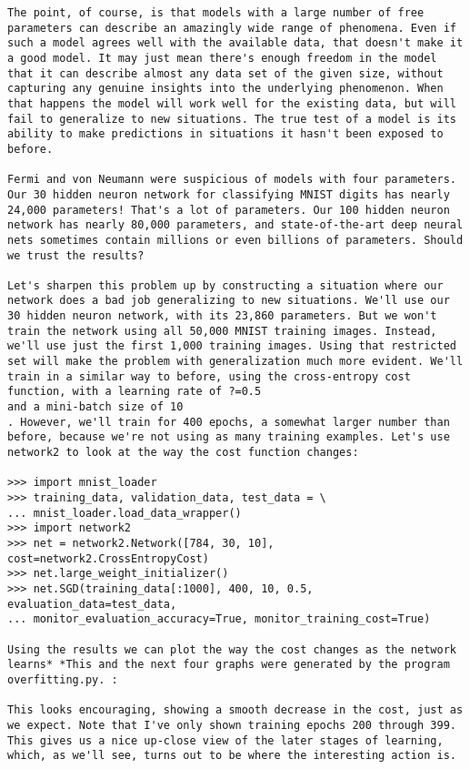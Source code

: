 \begin{lstlisting}
The point, of course, is that models with a large number of free parameters can describe an amazingly wide range of phenomena. Even if such a model agrees well with the available data, that doesn't make it a good model. It may just mean there's enough freedom in the model that it can describe almost any data set of the given size, without capturing any genuine insights into the underlying phenomenon. When that happens the model will work well for the existing data, but will fail to generalize to new situations. The true test of a model is its ability to make predictions in situations it hasn't been exposed to before.

Fermi and von Neumann were suspicious of models with four parameters. Our 30 hidden neuron network for classifying MNIST digits has nearly 24,000 parameters! That's a lot of parameters. Our 100 hidden neuron network has nearly 80,000 parameters, and state-of-the-art deep neural nets sometimes contain millions or even billions of parameters. Should we trust the results?

Let's sharpen this problem up by constructing a situation where our network does a bad job generalizing to new situations. We'll use our 30 hidden neuron network, with its 23,860 parameters. But we won't train the network using all 50,000 MNIST training images. Instead, we'll use just the first 1,000 training images. Using that restricted set will make the problem with generalization much more evident. We'll train in a similar way to before, using the cross-entropy cost function, with a learning rate of ?=0.5
and a mini-batch size of 10
. However, we'll train for 400 epochs, a somewhat larger number than before, because we're not using as many training examples. Let's use network2 to look at the way the cost function changes:
 
>>> import mnist_loader 
>>> training_data, validation_data, test_data = \
... mnist_loader.load_data_wrapper()
>>> import network2 
>>> net = network2.Network([784, 30, 10], cost=network2.CrossEntropyCost) 
>>> net.large_weight_initializer()
>>> net.SGD(training_data[:1000], 400, 10, 0.5, evaluation_data=test_data,
... monitor_evaluation_accuracy=True, monitor_training_cost=True)

Using the results we can plot the way the cost changes as the network learns* *This and the next four graphs were generated by the program overfitting.py. :

This looks encouraging, showing a smooth decrease in the cost, just as we expect. Note that I've only shown training epochs 200 through 399. This gives us a nice up-close view of the later stages of learning, which, as we'll see, turns out to be where the interesting action is.


\end{lstlisting}
